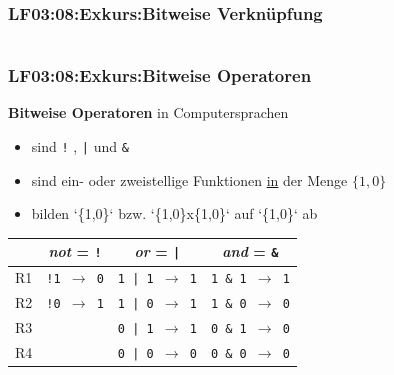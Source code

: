 
\begin{frame}[fragile]  
  \frametitle{LF03:08:Exkurs:Bitweise Verknüpfung}
  \begin{center}
    \begin{minipage}{0.9\textwidth}
      \inputminted[fontsize=\footnotesize,linenos]{python}{\snpLf/dm-0308-bitmask.py}
    \end{minipage}
  \end{center}
\end{frame}

\begin{frame}[fragile]  
  \frametitle{LF03:08:Exkurs:Bitweise Operatoren}
  \vspace{0.2cm}

  \begin{small}
  \textbf{Bitweise Operatoren} in Computersprachen
  \begin{itemize}
    \item sind \texttt{!} , \texttt{|} und \texttt{\&} 
    \item sind ein- oder zweistellige Funktionen \underline{in} der Menge $\{1,0\}$
    \item bilden `\{1,0\}` bzw. `\{1,0\}x\{1,0\}` auf `\{1,0\}` ab
  \end{itemize}
    
  \vspace{0.2cm}
  \begin{center}

      \renewcommand{\arraystretch}{1.3}
\begin{tabular}{c|c|c|c|}
  & \textit{not} = \texttt{!} & \textit{or} = \texttt{|} & \textit{and} = \texttt{\&} \\
  \hline
  R1 & \texttt{!1 $\rightarrow$ 0} & \texttt{1 | 1 $\rightarrow$ 1} & \texttt{1 \& 1 $\rightarrow$ 1} \\
  \hline
  R2 & \texttt{!0 $\rightarrow$ 1} & \texttt{1 | 0 $\rightarrow$ 1} & \texttt{1 \& 0 $\rightarrow$ 0} \\
  \hline
  R3 &  & \texttt{0 | 1 $\rightarrow$ 1} & \texttt{0 \& 1 $\rightarrow$ 0} \\
  \hline
  R4 &  & \texttt{0 | 0 $\rightarrow$ 0} & \texttt{0 \& 0 $\rightarrow$ 0} \\


\end{tabular}
\end{center}
\end{small}
\end{frame}
